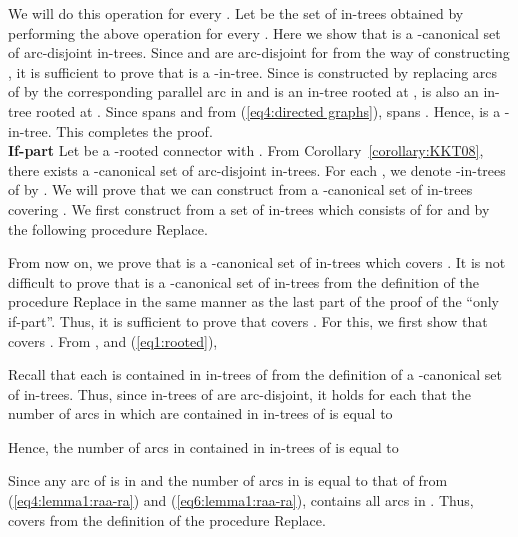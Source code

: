 \documentclass[11pt]{article}
\newcounter{ni}
\theoremstyle{plain}
\newcommand{\eop}{\hfill \usebox{\ProofSym}}
\newenvironment{proof}{\noindent {\it Proof.}}{\eop\par\vspace{0.3cm}}
\begin{document}
\begin{proof}
We will do this operation for every .
Let  be the set of in-trees obtained by performing the above operation for every . 
Here we show that  is a -canonical set of arc-disjoint in-trees. 
Since  and  are arc-disjoint for  
from the way of constructing , 
it is sufficient to prove that  is a -in-tree. 
Since  is constructed by replacing arcs of  by 
the corresponding parallel arc in  and 
 is an in-tree rooted at ,  
 is also an in-tree rooted at . Since  spans  and from (\ref{eq4:directed graphs}), 
 spans . Hence,  
is a -in-tree. This completes the proof. \\
{\bf If-part}
Let  be a -rooted connector with . 
From Corollary~\ref{corollary:KKT08}, there exists a -canonical set  of arc-disjoint 
in-trees. For each , we denote  -in-trees of  
by .
We will prove that we can construct from  
a -canonical set of in-trees covering . 
We first construct from  a set  of in-trees which consists of  for 
and  by the following procedure {\sf Replace}.
\begin{center}
\end{center}

From now on, we prove that  is a -canonical set of 
in-trees which covers . 
It is not difficult to prove that  is a -canonical set of in-trees 
from the definition of the procedure {\sf Replace} in the same manner as the last part 
of the proof of the ``only if-part''. 
Thus, it is sufficient to prove that  covers . 
For this, we first show that 
 covers . 
From ,  and (\ref{eq1:rooted}), 

Recall that each  is contained in  in-trees of 
from the definition of a -canonical set of in-trees. 
Thus, since in-trees of  are arc-disjoint, 
it holds for each  that  
the number of arcs in 
which are contained in in-trees of  is equal to 

Hence, the number of arcs in  contained in in-trees of 
 is equal to

Since any arc of  is in  and the number of arcs in 
is equal to that of 
from (\ref{eq4:lemma1:raa-ra}) and (\ref{eq6:lemma1:raa-ra}),
 contains all arcs in . 
Thus,  covers  from the definition of the procedure {\sf Replace}. 
\end{proof}
\end{document}
